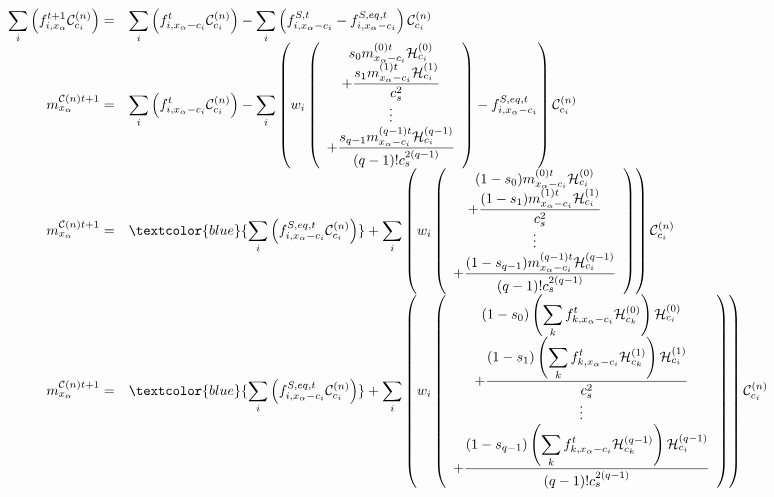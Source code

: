 \documentclass[letterpaper,10pt,english,openany,oneside]{jupyterBook}
\begin{document}
\begin{equation*}
\begin{split}
\begin{array}{rl}
\displaystyle\sum_{i}\Big( f_{i,x_{\alpha}}^{t+1}\mathcal{C}_{c_{i}}^{(n)} \Big) = & \displaystyle\sum_{i}\left(f_{i,x_{\alpha}-c_{i}}^{t}\mathcal{C}_{c_{i}}^{(n)}\right)  - \displaystyle\sum_{i}\left( f_{i,x_{\alpha}-c_{i}}^{S,t} - f_{i,x_{\alpha}-c_{i}}^{S,eq,t} \right)\mathcal{C}_{c_{i}}^{(n)} \\
m_{x_{\alpha}}^{\mathcal{C}(n)t+1} = & \displaystyle\sum_{i}\left(f_{i,x_{\alpha}-c_{i}}^{t}\mathcal{C}_{c_{i}}^{(n)}\right)  - \displaystyle\sum_{i}\left( w_{i}\left(\begin{array}{c} s_{0}m^{(0)t}_{x_{\alpha}-c_{i}}\mathcal{H}^{(0)}_{c_{i}} \\+ \displaystyle\frac{s_{1}m^{(1)t}_{x_{\alpha}-c_{i}}\mathcal{H}^{(1)}_{c_{i}}}{c_{s}^{2}} \\ \vdots \\+ \displaystyle\frac{s_{q-1}m^{(q-1)t}_{x_{\alpha}-c_{i}}\mathcal{H}^{(q-1)}_{c_{i}}}{(q-1)!c_{s}^{2(q-1)}}\end{array} \right) - f_{i,x_{\alpha}-c_{i}}^{S,eq,t} \right)\mathcal{C}_{c_{i}}^{(n)} \\
m_{x_{\alpha}}^{\mathcal{C}(n)t+1} = & \textcolor{blue}{\displaystyle\sum_{i}\left(f_{i,x_{\alpha}-c_{i}}^{S,eq,t}\mathcal{C}_{c_{i}}^{(n)}\right)} + \displaystyle\sum_{i}\left( w_{i}\left( \begin{array}{c} (1-s_{0})m^{(0)t}_{x_{\alpha}-c_{i}}\mathcal{H}^{(0)}_{c_{i}} \\ + \displaystyle\frac{(1-s_{1})m^{(1)t}_{x_{\alpha}-c_{i}}\mathcal{H}^{(1)}_{c_{i}}}{c_{s}^{2}} \\ \vdots \\+ \displaystyle\frac{(1-s_{q-1})m^{(q-1)t}_{x_{\alpha}-c_{i}}\mathcal{H}^{(q-1)}_{c_{i}}}{(q-1)!c_{s}^{2(q-1)}} \end{array} \right) \right)\mathcal{C}_{c_{i}}^{(n)}\\
m_{x_{\alpha}}^{\mathcal{C}(n)t+1} = & \textcolor{blue}{\displaystyle\sum_{i}\left(f_{i,x_{\alpha}-c_{i}}^{S,eq,t}\mathcal{C}_{c_{i}}^{(n)}\right)} + \displaystyle\sum_{i}\left( w_{i}\left(\begin{array}{c} (1-s_{0})\left(\displaystyle\sum_{k}f^{t}_{k,x_{\alpha}-c_{i}}\mathcal{H}^{(0)}_{c_{k}}\right)\mathcal{H}^{(0)}_{c_{i}}\\ + \displaystyle\frac{(1-s_{1})\left(\displaystyle\sum_{k}f^{t}_{k,x_{\alpha}-c_{i}}\mathcal{H}^{(1)}_{c_{k}}\right)\mathcal{H}^{(1)}_{c_{i}}}{c_{s}^{2}}\\  \vdots \\ + \displaystyle\frac{(1-s_{q-1})\left(\displaystyle\sum_{k}f^{t}_{k,x_{\alpha}-c_{i}}\mathcal{H}^{(q-1)}_{c_{k}}\right)\mathcal{H}^{(q-1)}_{c_{i}}}{(q-1)!c_{s}^{2(q-1)}} \end{array} \right) \right)\mathcal{C}_{c_{i}}^{(n)}
\end{array}
\end{split}
\end{equation*}
\end{document}
